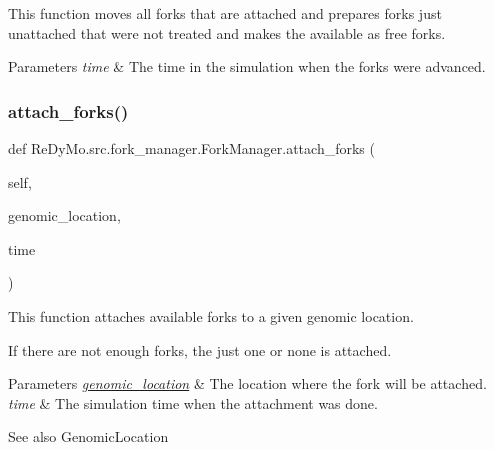 This function moves all forks that are attached and prepares forks just unattached that were not treated and makes the available as free forks. 


\begin{DoxyParams}{Parameters}
{\em time} & The time in the simulation when the forks were advanced. \\
\hline
\end{DoxyParams}
\mbox{\label{classReDyMo_1_1src_1_1fork__manager_1_1ForkManager_a8cf93e36729878575dfecba9978f357a}} 
\subsubsection{\texorpdfstring{attach\+\_\+forks()}{attach\_forks()}}
{\footnotesize\ttfamily def Re\+Dy\+Mo.\+src.\+fork\+\_\+manager.\+Fork\+Manager.\+attach\+\_\+forks (\begin{DoxyParamCaption}\item[{}]{self,  }\item[{}]{genomic\+\_\+location,  }\item[{}]{time }\end{DoxyParamCaption})}



This function attaches available forks to a given genomic location. 

If there are not enough forks, the just one or none is attached. 
\begin{DoxyParams}{Parameters}
{\em \mbox{\hyperlink{namespaceReDyMo_1_1src_1_1genomic__location}{genomic\+\_\+location}}} & The location where the fork will be attached. \\
\hline
{\em time} & The simulation time when the attachment was done. \\
\hline
\end{DoxyParams}
\begin{DoxySeeAlso}{See also}
Genomic\+Location 
\end{DoxySeeAlso}
\mbox{\label{classReDyMo_1_1src_1_1fork__manager_1_1ForkManager_a1a5940ebd74e69fefb9f7cc00ab79737}} 
